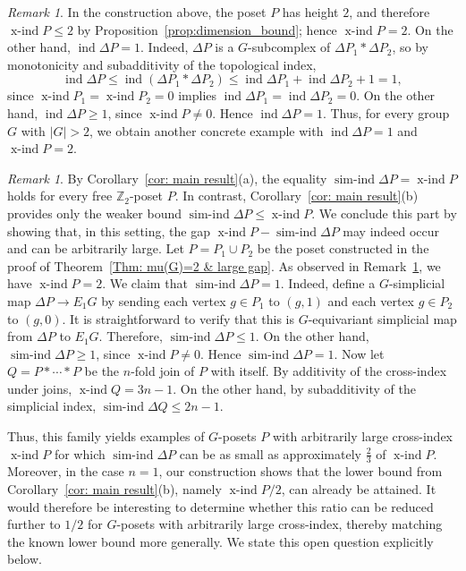 \documentclass[preprint,12pt]{article}
\renewcommand{\le}{\leqslant}
\renewcommand{\ge}{\geqslant}
\theoremstyle{definition}
\theoremstyle{remark}
\newtheorem{remark}[theorem]{Remark}
\numberwithin{equation}{section}
\DeclareMathOperator{\ind}{ind}
\DeclareMathOperator{\xind}{x-ind}
\DeclareMathOperator{\sind}{sim-ind}
\begin{document}
\begin{remark}\label{remark: final}
In the construction above, the poset \(P\) has height \(2\), and therefore \(\xind P\le 2\) by Proposition~\ref{prop:dimension_bound}; hence \(\xind P=2\). On the other hand,
\(
\ind \Delta P =1
\). Indeed, \(\Delta P\) is a \(G\)-subcomplex of \(\Delta P_1 * \Delta P_2\), so by monotonicity and subadditivity of the topological index,
\[
\ind \Delta P
\le \ind(\Delta P_1 * \Delta P_2)
\le \ind \Delta P_1 + \ind \Delta P_2 +1
=1,
\]
since \(\xind P_1=\xind P_2=0\) implies \(\ind \Delta P_1=\ind \Delta P_2=0\).
On the other hand, \(\ind \Delta P \ge 1\), since \(\xind P \neq 0\). Hence \(\ind \Delta P = 1\). Thus, for every group \(G\) with \(|G|>2\), we obtain another concrete example with \(\ind \Delta P=1\) and \(\xind P=2\).
\end{remark}

\begin{remark}\label{remark: gap between simplicial index & cross index}
By Corollary~\ref{cor: main result}(a), the equality \(\sind \Delta P = \xind P\) holds for every free \(\mathbb{Z}_2\)-poset \(P\). In contrast, Corollary~\ref{cor: main result}(b) provides only the weaker bound \(\sind \Delta P \le \xind P\). We conclude this part by showing that, in this setting, the gap \( \xind P - \sind \Delta P\) may indeed occur and can be arbitrarily large. Let \(P = P_1 \cup P_2\) be the poset constructed in the proof of Theorem~\ref{Thm: mu(G)=2 & large gap}. As observed in Remark~\ref{remark: final}, we have \(\xind P = 2\).
We claim that \(\sind \Delta P = 1\). Indeed, define a \(G\)-simplicial map \(\Delta P \to E_1G\) by sending each vertex \(g \in P_1\) to \((g,1)\) and each vertex \(g \in P_2\) to \((g,0)\). It is straightforward to verify that this is \(G\)-equivariant simplicial map from \(\Delta P\) to \(E_1G\). Therefore,
\(
\sind \Delta P \le 1.
\)
On the other hand, \(\sind \Delta P \ge 1\), since \(\xind P \neq 0\). Hence \(\sind \Delta P = 1\). Now let \( Q= P * \cdots * P\)
be the \(n\)-fold join of \(P\) with itself. By additivity of the cross-index under joins,
\(
\xind Q = 3n - 1.
\)
On the other hand, by subadditivity of the simplicial index,
\(
\sind \Delta Q
\le 2n - 1.
\)

Thus, this family yields examples of \(G\)-posets \(P\) with arbitrarily large cross-index \(\xind P\) for which \(\sind \Delta P\) can be as small as approximately \(\frac{2}{3}\) of \(\xind P\). Moreover, in the case \(n=1\), our construction shows that the lower bound from Corollary~\ref{cor: main result}(b), namely \(\xind P /2\), can already be attained. It would therefore be interesting to determine whether this ratio can be reduced further to \(1/2\) for \(G\)-posets with arbitrarily large cross-index, thereby matching the known lower bound more generally. We state this open question explicitly below.
\end{remark}
\end{document}
